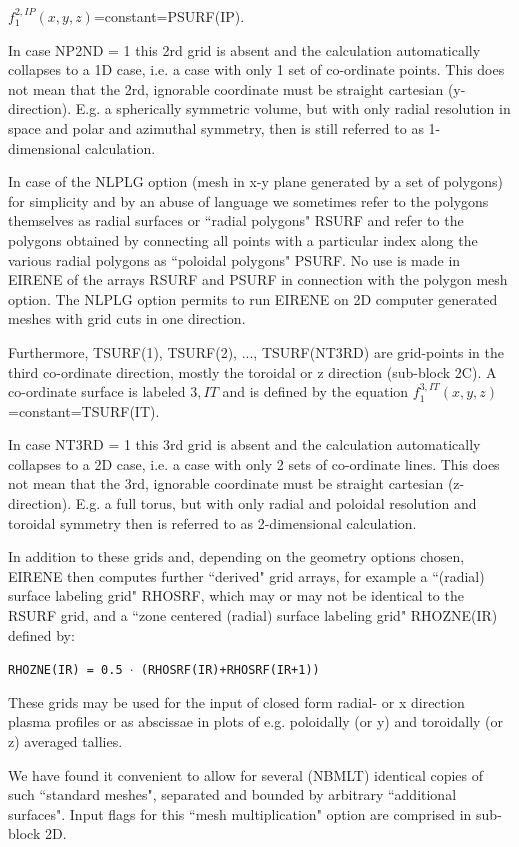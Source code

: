 $f_1^{2,IP} (x,y,z) $=constant=PSURF(IP).

In case NP2ND = 1 this 2rd grid is absent and the calculation automatically collapses to a 1D case,
i.e. a case with only 1 set of co-ordinate points.  This does not mean that the 2rd, ignorable coordinate must be
straight cartesian (y-direction). E.g. a spherically symmetric volume, but with only radial resolution in space
and polar and azimuthal symmetry,
then is still referred to as 1-dimensional calculation.

In case of the NLPLG option (mesh in x-y plane generated by a
set of polygons)
for simplicity and by an abuse of language we sometimes refer to
the polygons themselves as radial surfaces or ``radial polygons"
RSURF and refer to the
polygons obtained by connecting all points with a particular index along
the various radial polygons as ``poloidal polygons" PSURF.
No use is made in EIRENE of the arrays RSURF and PSURF in connection
with the polygon mesh option. The NLPLG option permits to run EIRENE
on 2D computer generated meshes with grid cuts in one direction.

Furthermore, TSURF(1), TSURF(2), ...,
TSURF(NT3RD) are grid-points in the third co-ordinate direction, mostly the toroidal or z direction (sub-block 2C).
A co-ordinate surface is labeled $3,IT$ and is defined by the equation
$f_1^{3,IT} (x,y,z)$
=constant=TSURF(IT).

In case NT3RD = 1 this 3rd grid is absent and the calculation automatically collapses to a 2D case,
i.e. a case with only 2 sets of co-ordinate lines.  This does not mean that the 3rd, ignorable coordinate must be
straight cartesian (z-direction). E.g. a full torus, but with only radial and poloidal resolution and toroidal symmetry
then is referred to as 2-dimensional calculation.

In addition to these grids and, depending on the geometry options
chosen, EIRENE then computes further ``derived" grid arrays, for example
a ``(radial) surface labeling grid" RHOSRF, which may or may not be
identical to the RSURF grid,
and a ``zone centered (radial) surface labeling grid"
RHOZNE(IR) defined by:

\texttt{RHOZNE(IR) = 0.5 $\cdot$ (RHOSRF(IR)+RHOSRF(IR+1))}

These grids may be used for the input of closed form
radial- or x direction
plasma profiles or as abscissae in plots of e.g.
poloidally (or y) and toroidally
(or z) averaged tallies.

We have found it convenient to allow for several (NBMLT)
identical copies
of such ``standard meshes", separated and bounded by arbitrary
``additional surfaces".
Input flags for this ``mesh multiplication"
option are comprised in sub-block 2D.

